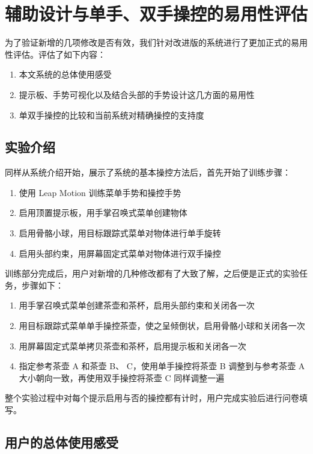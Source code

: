 \section{辅助设计与单手、双手操控的易用性评估}
\label{sec:exp:usability}

为了验证新增的几项修改是否有效，我们针对改进版的系统进行了更加正式的易用性评估。评估了如下内容：

\begin{enumerate}
\item 本文系统的总体使用感受
\item 提示板、手势可视化以及结合头部的手势设计这几方面的易用性
\item 单双手操控的比较和当前系统对精确操控的支持度
\end{enumerate}

\subsection{实验介绍}
同样从系统介绍开始，展示了系统的基本操控方法后，首先开始了训练步骤：
\begin{enumerate}
\item 使用 Leap Motion 训练菜单手势和操控手势
\item 启用顶置提示板，用手掌召唤式菜单创建物体
\item 启用骨骼小球，用目标跟踪式菜单对物体进行单手旋转
\item 启用头部约束，用屏幕固定式菜单对物体进行双手操控
\end{enumerate}

训练部分完成后，用户对新增的几种修改都有了大致了解，之后便是正式的实验任务，步骤如下：
\begin{enumerate}
\item 用手掌召唤式菜单创建茶壶和茶杯，启用头部约束和关闭各一次
\item 用目标跟踪式菜单单手操控茶壶，使之呈倾倒状，启用骨骼小球和关闭各一次
\item 用屏幕固定式菜单拷贝茶壶和茶杯，启用提示板和关闭各一次
\item 指定参考茶壶 A 和茶壶 B、 C，使用单手操控将茶壶 B 调整到与参考茶壶 A 大小朝向一致，再使用双手操控将茶壶 C 同样调整一遍
\label{item:uniandbi}
\end{enumerate}

整个实验过程中对每个提示启用与否的操控都有计时，用户完成实验后进行问卷填写。

\subsection{用户的总体使用感受}

